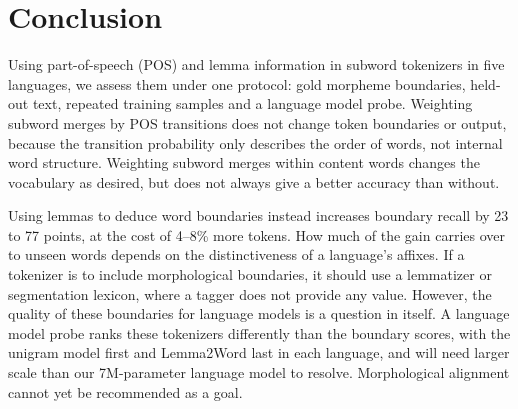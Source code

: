 \section{Conclusion}\label{sec:conclusion}
Using part-of-speech (POS) and lemma information in subword tokenizers in five languages, we assess them under one protocol: gold morpheme boundaries, held-out text, repeated training samples and a language model probe.
Weighting subword merges by POS transitions does not change token boundaries or output, because the transition probability only describes the order of words, not internal word structure.
Weighting subword merges within content words changes the vocabulary as desired, but does not always give a better accuracy than without.

Using lemmas to deduce word boundaries instead increases boundary recall by 23 to 77 points, at the cost of 4--8\% more tokens.
How much of the gain carries over to unseen words depends on the distinctiveness of a language's affixes.
If a tokenizer is to include morphological boundaries, it should use a lemmatizer or segmentation lexicon, where a tagger does not provide any value.
However, the quality of these boundaries for language models is a question in itself.
A language model probe ranks these tokenizers differently than the boundary scores, with the unigram model first and Lemma2Word last in each language, and will need larger scale than our 7M-parameter language model to resolve.
Morphological alignment cannot yet be recommended as a goal.
